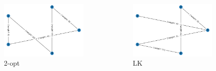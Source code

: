 \documentclass[10pt]{beamer}
\begin{document}
\begin{frame}
\begin{columns}
\begin{minipage}[c][0.4\textheight][c]{\linewidth}
\begin{figure}
  \includegraphics[width=0.8\linewidth]{primeri/primer1_2opt.png}
\caption{2-opt}
\label{Slika 2}
\end{figure}
\end{minipage}

\begin{minipage}[c][0.4\textheight][c]{\linewidth}
\begin{figure}
  \includegraphics[width=0.8\linewidth]{primeri/primer1_lk.png}
\caption{LK}
\label{Slika 4}
\end{figure}
\end{minipage}
\end{columns}

\end{frame}
\end{document}

